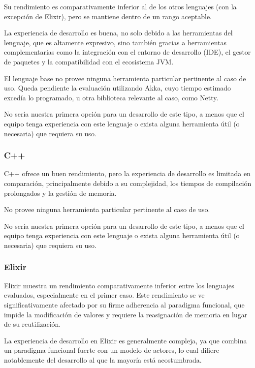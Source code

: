 \documentclass[11pt]{article}
\let\Oldsubsubsection\subsubsection
\renewcommand{\subsubsection}{\FloatBarrier\Oldsubsubsection}
\begin{document}
Su rendimiento es comparativamente inferior al de los otros lenguajes (con la excepción de Elixir), pero se mantiene dentro de un rango aceptable.

La experiencia de desarrollo es buena, no solo debido a las herramientas del lenguaje, que es altamente expresivo, sino también gracias a herramientas complementarias como la integración con el entorno de desarrollo (IDE), el gestor de paquetes y la compatibilidad con el ecosistema JVM.

El lenguaje base no provee ninguna herramienta particular pertinente al caso de uso. Queda pendiente la evaluación utilizando Akka, cuyo tiempo estimado excedía lo programado, u otra biblioteca relevante al caso, como Netty. 

No sería nuestra primera opción para un desarrollo de este tipo, a menos que el equipo tenga experiencia con este lenguaje o exista alguna herramienta útil (o necesaria) que requiera su uso.

\subsubsection{C++}

C++ ofrece un buen rendimiento, pero la experiencia de desarrollo es limitada en comparación, principalmente debido a su complejidad, los tiempos de compilación prolongados y la gestión de memoria.

No provee ninguna herramienta particular pertinente al caso de uso.

No sería nuestra primera opción para un desarrollo de este tipo, a menos que el equipo tenga experiencia con este lenguaje o exista alguna herramienta útil (o necesaria) que requiera su uso.

\subsubsection{Elixir}

Elixir muestra un rendimiento comparativamente inferior entre los lenguajes evaluados, especialmente en el primer caso. Este rendimiento se ve significativamente afectado por su firme adherencia al paradigma funcional, que impide la modificación de valores y requiere la reasignación de memoria en lugar de su reutilización.

La experiencia de desarrollo en Elixir es generalmente compleja, ya que combina un paradigma funcional fuerte con un modelo de actores, lo cual difiere notablemente del desarrollo al que la mayoría está acostumbrada.
\end{document}
